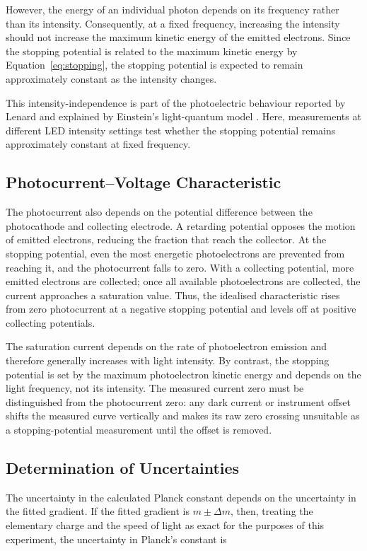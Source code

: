 \documentclass[12pt,a4paper]{article}
\begin{document}
However, the energy of an individual photon depends on its frequency rather than its intensity. Consequently, at a fixed frequency, increasing the intensity should not increase the maximum kinetic energy of the emitted electrons. Since the stopping potential is related to the maximum kinetic energy by Equation~\ref{eq:stopping}, the stopping potential is expected to remain approximately constant as the intensity changes.

This intensity-independence is part of the photoelectric behaviour reported by Lenard and explained by Einstein's light-quantum model \cite{lenard1902,einstein1905}. Here, measurements at different LED intensity settings test whether the stopping potential remains approximately constant at fixed frequency.

\subsection{Photocurrent--Voltage Characteristic}

The photocurrent also depends on the potential difference between the photocathode and collecting electrode. A retarding potential opposes the motion of emitted electrons, reducing the fraction that reach the collector. At the stopping potential, even the most energetic photoelectrons are prevented from reaching it, and the photocurrent falls to zero. With a collecting potential, more emitted electrons are collected; once all available photoelectrons are collected, the current approaches a saturation value. Thus, the idealised characteristic rises from zero photocurrent at a negative stopping potential and levels off at positive collecting potentials.

The saturation current depends on the rate of photoelectron emission and therefore generally increases with light intensity. By contrast, the stopping potential is set by the maximum photoelectron kinetic energy and depends on the light frequency, not its intensity. The measured current zero must be distinguished from the photocurrent zero: any dark current or instrument offset shifts the measured curve vertically and makes its raw zero crossing unsuitable as a stopping-potential measurement until the offset is removed.

\subsection{Determination of Uncertainties}

The uncertainty in the calculated Planck constant depends on the uncertainty in the fitted gradient. If the fitted gradient is \(m\pm\Delta m\), then, treating the elementary charge and the speed of light as exact for the purposes of this experiment, the uncertainty in Planck's constant is
\end{document}

